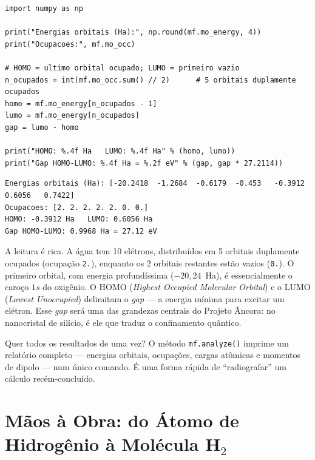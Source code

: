 \documentclass[11pt,a4paper,openany]{book}
\newcommand{\code}[1]{\texttt{#1}}
\begin{document}
\begin{lstlisting}[style=python,caption={Lendo orbitais, ocupações e o \emph{gap} HOMO--LUMO.},label={lst:orbitais}]
import numpy as np

print("Energias orbitais (Ha):", np.round(mf.mo_energy, 4))
print("Ocupacoes:", mf.mo_occ)

# HOMO = ultimo orbital ocupado; LUMO = primeiro vazio
n_ocupados = int(mf.mo_occ.sum() // 2)      # 5 orbitais duplamente ocupados
homo = mf.mo_energy[n_ocupados - 1]
lumo = mf.mo_energy[n_ocupados]
gap = lumo - homo

print("HOMO: %.4f Ha   LUMO: %.4f Ha" % (homo, lumo))
print("Gap HOMO-LUMO: %.4f Ha = %.2f eV" % (gap, gap * 27.2114))
\end{lstlisting}

\begin{lstlisting}[style=console]
Energias orbitais (Ha): [-20.2418  -1.2684  -0.6179  -0.453   -0.3912   0.6056   0.7422]
Ocupacoes: [2. 2. 2. 2. 2. 0. 0.]
HOMO: -0.3912 Ha   LUMO: 0.6056 Ha
Gap HOMO-LUMO: 0.9968 Ha = 27.12 eV
\end{lstlisting}

\noindent
A leitura é rica. A água tem 10 elétrons, distribuídos em 5 orbitais duplamente
ocupados (ocupação \code{2.}), enquanto os 2 orbitais restantes estão vazios
(\code{0.}). O primeiro orbital, com energia profundíssima ($-20{,}24$~Ha),
é essencialmente o caroço $1s$ do oxigênio. O HOMO
(\emph{Highest Occupied Molecular Orbital}) e o LUMO (\emph{Lowest Unoccupied})
delimitam o \emph{gap} --- a energia mínima para excitar um elétron. Esse \emph{gap}
será uma das grandezas centrais do Projeto Âncora: no nanocristal de silício, é
ele que traduz o confinamento quântico.

\begin{caixadica}
Quer todos os resultados de uma vez? O método \code{mf.analyze()} imprime um
relatório completo --- energias orbitais, ocupações, cargas atômicas e momentos de
dipolo --- num único comando. É uma forma rápida de ``radiografar'' um cálculo
recém-concluído.
\end{caixadica}

\section{Mãos à Obra: do Átomo de Hidrogênio à Molécula H$_2$}
\label{sec:maos2}
\end{document}
